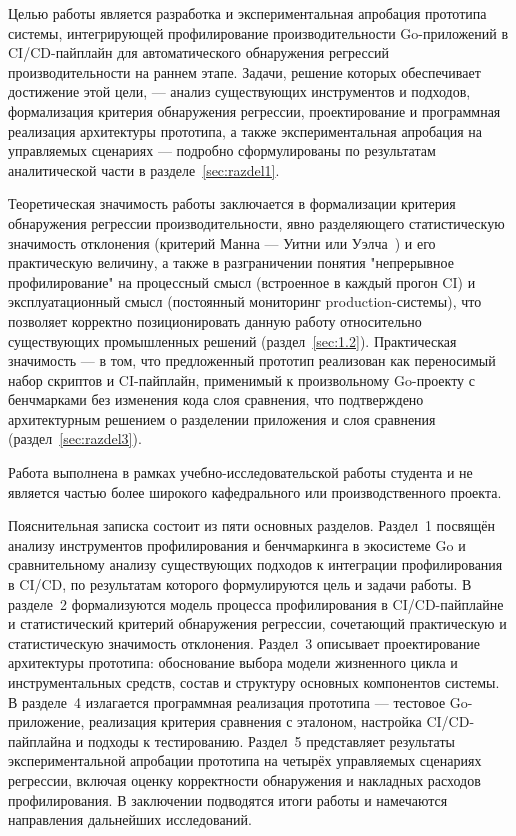 \documentclass[12pt,a4paper]{article}
\numberwithin{equation}{section}
\begin{document}
Целью работы является разработка и экспериментальная апробация прототипа
системы, интегрирующей профилирование производительности Go-приложений в
CI/CD-пайплайн для автоматического обнаружения регрессий производительности
на раннем этапе. Задачи, решение которых обеспечивает достижение этой
цели, — анализ существующих инструментов и подходов, формализация
критерия обнаружения регрессии, проектирование и программная реализация
архитектуры прототипа, а также экспериментальная апробация на управляемых
сценариях — подробно сформулированы по результатам аналитической части в
разделе~\ref{sec:razdel1}.

Теоретическая значимость работы заключается в формализации критерия
обнаружения регрессии производительности, явно разделяющего
статистическую значимость отклонения (критерий Манна --- Уитни или
Уэлча~\cite{welch1947}) и его практическую величину, а также в
разграничении понятия "непрерывное профилирование" на процессный смысл
(встроенное в каждый прогон CI) и эксплуатационный смысл (постоянный
мониторинг production-системы), что позволяет корректно позиционировать
данную работу относительно существующих промышленных решений
(раздел~\ref{sec:1.2}). Практическая значимость — в том, что предложенный
прототип реализован как переносимый набор скриптов и CI-пайплайн,
применимый к произвольному Go-проекту с бенчмарками без изменения кода
слоя сравнения, что подтверждено архитектурным решением о разделении
приложения и слоя сравнения (раздел~\ref{sec:razdel3}).

Работа выполнена в рамках учебно-исследовательской работы студента и не
является частью более широкого кафедрального или производственного
проекта.

Пояснительная записка состоит из пяти основных разделов. Раздел~1
посвящён анализу инструментов профилирования и бенчмаркинга в экосистеме
Go и сравнительному анализу существующих подходов к интеграции
профилирования в CI/CD, по результатам которого формулируются цель и
задачи работы. В разделе~2 формализуются модель процесса профилирования в
CI/CD-пайплайне и статистический критерий обнаружения регрессии,
сочетающий практическую и статистическую значимость отклонения. Раздел~3
описывает проектирование архитектуры прототипа: обоснование выбора модели
жизненного цикла и инструментальных средств, состав и структуру основных
компонентов системы. В разделе~4 излагается программная реализация
прототипа — тестовое Go-приложение, реализация критерия сравнения с
эталоном, настройка CI/CD-пайплайна и подходы к тестированию. Раздел~5
представляет результаты экспериментальной апробации прототипа на четырёх
управляемых сценариях регрессии, включая оценку корректности обнаружения
и накладных расходов профилирования. В заключении подводятся итоги работы
и намечаются направления дальнейших исследований.
\end{document}
